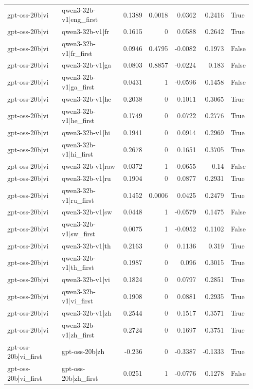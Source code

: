 \begin{table}
\begin{tabular}{l l r r r r l}
gpt-oss-20b|vi & qwen3-32b-v1|eng_first & 0.1389 & 0.0018 & 0.0362 & 0.2416 & True \\
gpt-oss-20b|vi & qwen3-32b-v1|fr & 0.1615 & 0 & 0.0588 & 0.2642 & True \\
gpt-oss-20b|vi & qwen3-32b-v1|fr_first & 0.0946 & 0.4795 & -0.0082 & 0.1973 & False \\
gpt-oss-20b|vi & qwen3-32b-v1|ga & 0.0803 & 0.8857 & -0.0224 & 0.183 & False \\
gpt-oss-20b|vi & qwen3-32b-v1|ga_first & 0.0431 & 1 & -0.0596 & 0.1458 & False \\
gpt-oss-20b|vi & qwen3-32b-v1|he & 0.2038 & 0 & 0.1011 & 0.3065 & True \\
gpt-oss-20b|vi & qwen3-32b-v1|he_first & 0.1749 & 0 & 0.0722 & 0.2776 & True \\
gpt-oss-20b|vi & qwen3-32b-v1|hi & 0.1941 & 0 & 0.0914 & 0.2969 & True \\
gpt-oss-20b|vi & qwen3-32b-v1|hi_first & 0.2678 & 0 & 0.1651 & 0.3705 & True \\
gpt-oss-20b|vi & qwen3-32b-v1|raw & 0.0372 & 1 & -0.0655 & 0.14 & False \\
gpt-oss-20b|vi & qwen3-32b-v1|ru & 0.1904 & 0 & 0.0877 & 0.2931 & True \\
gpt-oss-20b|vi & qwen3-32b-v1|ru_first & 0.1452 & 0.0006 & 0.0425 & 0.2479 & True \\
gpt-oss-20b|vi & qwen3-32b-v1|sw & 0.0448 & 1 & -0.0579 & 0.1475 & False \\
gpt-oss-20b|vi & qwen3-32b-v1|sw_first & 0.0075 & 1 & -0.0952 & 0.1102 & False \\
gpt-oss-20b|vi & qwen3-32b-v1|th & 0.2163 & 0 & 0.1136 & 0.319 & True \\
gpt-oss-20b|vi & qwen3-32b-v1|th_first & 0.1987 & 0 & 0.096 & 0.3015 & True \\
gpt-oss-20b|vi & qwen3-32b-v1|vi & 0.1824 & 0 & 0.0797 & 0.2851 & True \\
gpt-oss-20b|vi & qwen3-32b-v1|vi_first & 0.1908 & 0 & 0.0881 & 0.2935 & True \\
gpt-oss-20b|vi & qwen3-32b-v1|zh & 0.2544 & 0 & 0.1517 & 0.3571 & True \\
gpt-oss-20b|vi & qwen3-32b-v1|zh_first & 0.2724 & 0 & 0.1697 & 0.3751 & True \\
gpt-oss-20b|vi_first & gpt-oss-20b|zh & -0.236 & 0 & -0.3387 & -0.1333 & True \\
gpt-oss-20b|vi_first & gpt-oss-20b|zh_first & 0.0251 & 1 & -0.0776 & 0.1278 & False \\

\end{tabular}
\end{table}
